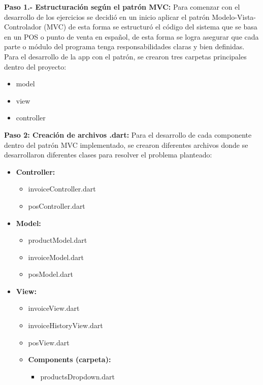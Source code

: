 \textbf{Paso 1.- Estructuración según el patrón MVC:}
Para comenzar con el desarrollo de los ejercicios se decidió en un inicio aplicar el patrón Modelo-Vista-Controlador (MVC) de esta forma se estructuró el código del sistema que se basa en un POS o punto de venta en español, de esta forma se logra asegurar que cada parte o módulo del programa tenga responsabilidades claras y bien definidas. Para el desarrollo de la app con el patrón, se crearon tres carpetas principales dentro del proyecto:
\begin{itemize}
    \item model
    \item view
    \item controller
\end{itemize}

\textbf{Paso 2: Creación de archivos .dart:}
Para el desarrollo de cada componente dentro del patrón MVC implementado, se crearon diferentes archivos donde se desarrollaron diferentes clases para resolver el problema planteado: 

\begin{itemize}
    \item \textbf{Controller:} 
        \begin{itemize}
            \item invoiceController.dart
            \item posController.dart
        \end{itemize}
    \item \textbf{Model:} 
        \begin{itemize}
            \item productModel.dart
            \item invoiceModel.dart
            \item posModel.dart
        \end{itemize}
    \item \textbf{View:} 
        \begin{itemize}
            \item invoiceView.dart
            \item invoiceHistoryView.dart
            \item posView.dart
            \item \textbf{Components (carpeta):}
                \begin{itemize}
                    \item productsDropdown.dart
                \end{itemize}
        \end{itemize}
\end{itemize}

